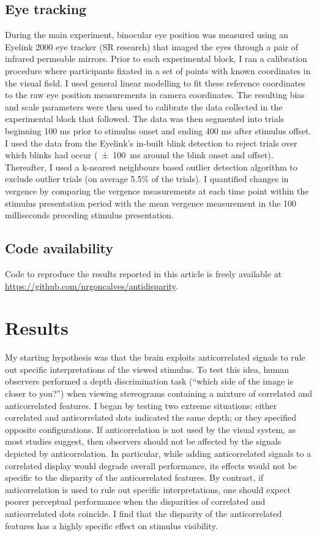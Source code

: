 \subsection{Eye tracking}
During the main experiment, binocular eye position was measured using an Eyelink 2000 eye tracker (SR research) that imaged the eyes through a pair of infrared permeable mirrors. Prior to each experimental block, I ran a calibration procedure where participants fixated in a set of points with known coordinates in the visual field. I used general linear modelling to fit these reference coordinates to the raw eye position measurements in camera coordinates. The resulting bias and scale parameters were then used to calibrate the data collected in the experimental block that followed. The data was then segmented into trials beginning 100 ms prior to stimulus onset and ending 400 ms after stimulus offset. I used the data from the Eyelink's in-built blink detection to reject trials over which blinks had occur (\SI{\pm 100}{ms} around the blink onset and offset). Thereafter, I used a k-nearest neighbours based outlier detection algorithm to exclude outlier trials (on average 5.5\% of the trials). I quantified changes in vergence by comparing the vergence measurements at each time point within the stimulus presentation period with the mean vergence measurement in the 100 milliseconds preceding stimulus presentation.

\subsection{Code availability}
Code to reproduce the results reported in this article is freely available at \url{https://github.com/nrgoncalves/antidisparity}.


\section{Results}

My starting hypothesis was that the brain exploits anticorrelated signals to rule out specific interpretations of the viewed stimulus. To test this idea, human observers performed a depth discrimination task (``which side of the image is closer to you?'') when viewing stereograms containing a mixture of correlated and anticorrelated features. I began by testing two extreme situations: either correlated and anticorrelated dots indicated the same depth; or they specified opposite configurations. If anticorrelation is not used by the visual system, as most studies suggest\cite{Read:2005no}, then observers should not be affected by the signals depicted by anticorrelation. In particular, while adding anticorrelated signals to a correlated display would degrade overall performance, its effects would not be specific to the disparity of the anticorrelated features. By contrast, if anticorrelation is used to rule out specific interpretations, one should expect poorer perceptual performance when the disparities of correlated and anticorrelated dots coincide. I find that the disparity of the anticorrelated features has a highly specific effect on stimulus visibility.


